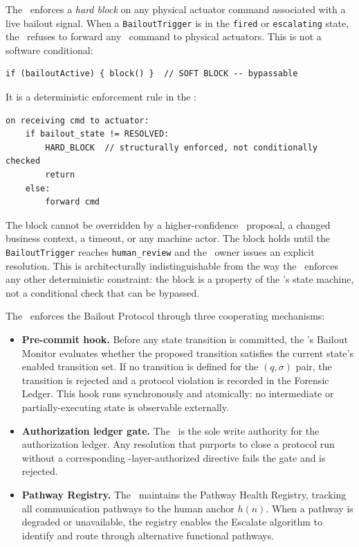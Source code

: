 The \fact\ enforces a \textit{hard block} on any physical actuator command associated with a live bailout signal. When a \texttt{BailoutTrigger} is in the \texttt{fired} or \texttt{escalating} state, the \fact\ refuses to forward any \bounds\ command to physical actuators. This is not a software conditional:

\begin{verbatim}
if (bailoutActive) { block() }  // SOFT BLOCK -- bypassable
\end{verbatim}

It is a deterministic enforcement rule in the \fact:

\begin{verbatim}
on receiving cmd to actuator:
    if bailout_state != RESOLVED:
        HARD_BLOCK  // structurally enforced, not conditionally checked
        return
    else:
        forward cmd
\end{verbatim}

The block cannot be overridden by a higher-confidence \bounds\ proposal, a changed business context, a timeout, or any machine actor. The block holds until the \texttt{BailoutTrigger} reaches \texttt{human\_review} and the \purpose\ owner issues an explicit resolution. This is architecturally indistinguishable from the way the \fact\ enforces any other deterministic constraint: the block is a property of the \fact's state machine, not a conditional check that can be bypassed.

The \fact\ enforces the Bailout Protocol through three cooperating mechanisms:

\begin{itemize}
\item[(\textit{i})] \textbf{Pre-commit hook.} Before any state transition is committed, the \fact's Bailout Monitor evaluates whether the proposed transition satisfies the current state's enabled transition set. If no transition is defined for the $(q, \sigma)$ pair, the transition is rejected and a protocol violation is recorded in the Forensic Ledger. This hook runs synchronously and atomically: no intermediate or partially-executing state is observable externally.

\item[(\textit{ii})] \textbf{Authorization ledger gate.} The \fact\ is the sole write authority for the authorization ledger. Any resolution that purports to close a protocol run without a corresponding \purpose-layer-authorized directive fails the gate and is rejected.

\item[(\textit{iii})] \textbf{Pathway Registry.} The \fact\ maintains the Pathway Health Registry, tracking all communication pathways to the human anchor $h(n)$. When a pathway is degraded or unavailable, the registry enables the Escalate algorithm to identify and route through alternative functional pathways.
\end{itemize}

